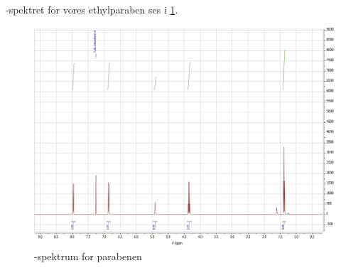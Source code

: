 \documentclass{report}
\begin{document}
-spektret for vores ethylparaben ses i \cref{fig:1HNMR}.
\begin{figure}[H]
\begin{center}
  \includegraphics[width=\textwidth]{1HNMR.png}
\end{center}
\caption{-spektrum for parabenen}
\label{fig:1HNMR}
\end{figure}
\end{document}
